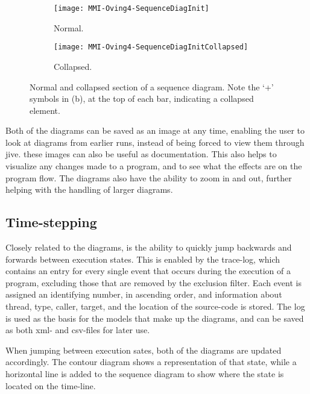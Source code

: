\begin{figure}[H]
	\centering
	\begin{subfigure}{\textwidth}
		\centering
		\texttt{[image: MMI-Oving4-SequenceDiagInit]}
		\caption{Normal.}
		\label{fig:seqOving4CollapseA}
	\end{subfigure}
	\begin{subfigure}{\textwidth}
		\centering
		\texttt{[image: MMI-Oving4-SequenceDiagInitCollapsed]}
		\caption{Collapsed.}
		\label{fig:seqOving4CollapseB}
	\end{subfigure}
	\caption[Normal and collapsed section of a sequence diagram.]{Normal and collapsed section of a sequence diagram. Note the `+' symbols in (b), at the top of each bar, indicating a collapsed element.}
	\label{fig:seqOving4Collapse} 
\end{figure}

Both of the diagrams can be saved as an image at any time, enabling the user to look at diagrams from earlier runs, instead of being forced to view them through \gls{jive}.
these images can also be useful as documentation.
This also helps to visualize any changes made to a program, and to see what the effects are on the program flow.
The diagrams also have the ability to zoom in and out, further helping with the handling of larger diagrams.

\subsection{Time-stepping}\label{jiveFeatTimeStep}

Closely related to the diagrams, is the ability to quickly jump backwards and forwards between execution states.
This is enabled by the trace-log, which contains an entry for every single event that occurs during the execution of a program, excluding those that are removed by the exclusion filter.
Each event is assigned an identifying number, in ascending order, and information about thread, type, caller, target, and the location of the source-code is stored.
The log is used as the basis for the models that make up the diagrams, and can be saved as both \gls{xml}- and \gls{csv}-files for later use.

When jumping between execution sates, both of the diagrams are updated accordingly.
The contour diagram shows a representation of that state, while a horizontal line is added to the sequence diagram to show where the state is located on the time-line.


